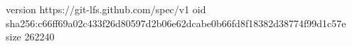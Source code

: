 version https://git-lfs.github.com/spec/v1
oid sha256:c66ff69a02c433f26d80597d2b06e62dcabe0b66fd8f18382d38774f99d1c57e
size 262240
